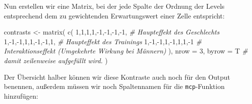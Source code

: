\documentclass[
]{book}
\newenvironment{Shaded}{\begin{snugshade}}{\end{snugshade}}
\newcommand{\AttributeTok}[1]{\textcolor[rgb]{0.77,0.63,0.00}{#1}}
\newcommand{\CommentTok}[1]{\textcolor[rgb]{0.56,0.35,0.01}{\textit{#1}}}
\newcommand{\DecValTok}[1]{\textcolor[rgb]{0.00,0.00,0.81}{#1}}
\newcommand{\FunctionTok}[1]{\textcolor[rgb]{0.00,0.00,0.00}{#1}}
\newcommand{\NormalTok}[1]{#1}
\newcommand{\OtherTok}[1]{\textcolor[rgb]{0.56,0.35,0.01}{#1}}
\newcommand{\SpecialCharTok}[1]{\textcolor[rgb]{0.00,0.00,0.00}{#1}}
\newcommand{\StringTok}[1]{\textcolor[rgb]{0.31,0.60,0.02}{#1}}
\begin{document}
Nun erstellen wir eine Matrix, bei der jede Spalte der Ordnung der Levels entsprechend dem zu gewichtenden Erwartungswert einer Zelle entspricht:

\begin{Shaded}
\begin{Highlighting}[]
\NormalTok{contrasts }\OtherTok{\textless{}{-}} \FunctionTok{matrix}\NormalTok{(}
  \FunctionTok{c}\NormalTok{(}
    \DecValTok{1}\NormalTok{,}\DecValTok{1}\NormalTok{,}\DecValTok{1}\NormalTok{,}\DecValTok{1}\NormalTok{,}\SpecialCharTok{{-}}\DecValTok{1}\NormalTok{,}\SpecialCharTok{{-}}\DecValTok{1}\NormalTok{,}\SpecialCharTok{{-}}\DecValTok{1}\NormalTok{,}\SpecialCharTok{{-}}\DecValTok{1}\NormalTok{, }\CommentTok{\# Haupteffekt des Geschlechts}
    \DecValTok{1}\NormalTok{,}\SpecialCharTok{{-}}\DecValTok{1}\NormalTok{,}\SpecialCharTok{{-}}\DecValTok{1}\NormalTok{,}\DecValTok{1}\NormalTok{,}\DecValTok{1}\NormalTok{,}\SpecialCharTok{{-}}\DecValTok{1}\NormalTok{,}\SpecialCharTok{{-}}\DecValTok{1}\NormalTok{,}\DecValTok{1}\NormalTok{, }\CommentTok{\# Haupteffekt des Trainings}
    \DecValTok{1}\NormalTok{,}\SpecialCharTok{{-}}\DecValTok{1}\NormalTok{,}\SpecialCharTok{{-}}\DecValTok{1}\NormalTok{,}\DecValTok{1}\NormalTok{,}\SpecialCharTok{{-}}\DecValTok{1}\NormalTok{,}\DecValTok{1}\NormalTok{,}\DecValTok{1}\NormalTok{,}\SpecialCharTok{{-}}\DecValTok{1} \CommentTok{\# Interaktionseffekt (Umgekehrte Wirkung bei Männern)}
\NormalTok{  ),}
  \AttributeTok{nrow =} \DecValTok{3}\NormalTok{,}
  \AttributeTok{byrow =}\NormalTok{ T }\CommentTok{\# damit zeilenweise aufgefüllt wird.}
\NormalTok{)}
\end{Highlighting}
\end{Shaded}

Der Übersicht halber können wir diese Kontraste auch noch für den Output benennen, außerdem müssen wir noch Spaltennamen für die \texttt{mcp}-Funktion hinzufügen:

\begin{Shaded}
\end{Shaded}
\end{document}
